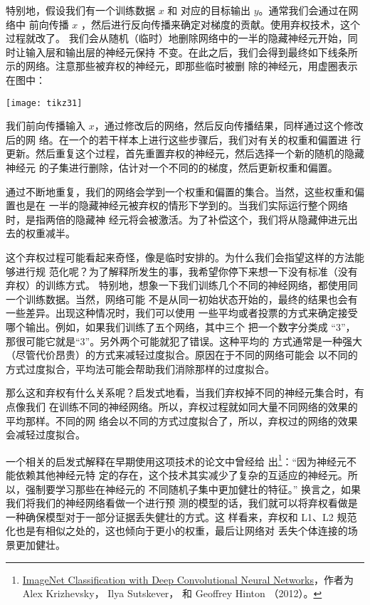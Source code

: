 特别地，假设我们有一个训练数据 $x$ 和 对应的目标输出 $y$。通常我们会通过在网络中
前向传播 $x$ ，然后进行反向传播来确定对梯度的贡献。使用弃权技术，这个过程就改了。
我们会从随机（临时）地删除网络中的一半的隐藏神经元开始，同时让输入层和输出层的神经元保持
不变。在此之后，我们会得到最终如下线条所示的网络。注意那些被弃权的神经元，即那些临时被删
除的神经元，用虚圈表示在图中：
\begin{center}
  \texttt{[image: tikz31]}
\end{center}

我们前向传播输入 $x$，通过修改后的网络，然后反向传播结果，同样通过这个修改后的网
络。在一个的若干样本上进行这些步骤后，我们对有关的权重和偏置进
行更新。然后重复这个过程，首先重置弃权的神经元，然后选择一个新的随机的隐藏神经元
的子集进行删除，估计对一个不同的\minibatch{}的梯度，然后更新权重和偏置。

通过不断地重复，我们的网络会学到一个权重和偏置的集合。当然，这些权重和偏置也是在
一半的隐藏神经元被弃权的情形下学到的。当我们实际运行整个网络时，是指两倍的隐藏神
经元将会被激活。为了补偿这个，我们将从隐藏伸进元出去的权重减半。

这个弃权过程可能看起来奇怪，像是临时安排的。为什么我们会指望这样的方法能够进行规
范化呢？为了解释所发生的事，我希望你停下来想一下没有标准（没有弃权）的训练方式。
特别地，想象一下我们训练几个不同的神经网络，都使用同一个训练数据。当然，网络可能
不是从同一初始状态开始的，最终的结果也会有一些差异。出现这种情况时，我们可以使用
一些平均或者投票的方式来确定接受哪个输出。例如，如果我们训练了五个网络，其中三个
把一个数字分类成 “3”，那很可能它就是“3”。另外两个可能就犯了错误。这种平均的
方式通常是一种强大（尽管代价昂贵）的方式来减轻过度拟合。原因在于不同的网络可能会
以不同的方式过度拟合，平均法可能会帮助我们消除那样的过度拟合。

那么这和弃权有什么关系呢？启发式地看，当我们弃权掉不同的神经元集合时，有点像我们
在训练不同的神经网络。所以，弃权过程就如同大量不同网络的效果的平均那样。不同的网
络会以不同的方式过度拟合了，所以，弃权过的网络的效果会减轻过度拟合。

一个相关的启发式解释\label{dropout_explanation}在早期使用这项技术的论文中曾经给
出\footnote{\href{https://papers.nips.cc/paper/4824-imagenet-classification-with-deep-convolutional-neural-networks.pdf}{ImageNet
    Classification with Deep Convolutional Neural Networks}，作者为 Alex Krizhevsky，
  Ilya Sutskever， 和 Geoffrey Hinton （2012）。}：“因为神经元不能依赖其他神经元特
定的存在，这个技术其实减少了复杂的互适应的神经元。所以，强制要学习那些在神经元的
不同随机子集中更加健壮的特征。” 换言之，如果我们将我们的神经网络看做一个进行预
测的模型的话，我们就可以将弃权看做是一种确保模型对于一部分证据丢失健壮的方式。这
样看来，弃权和 L1、L2 规范化也是有相似之处的，这也倾向于更小的权重，最后让网络对
丢失个体连接的场景更加健壮。


